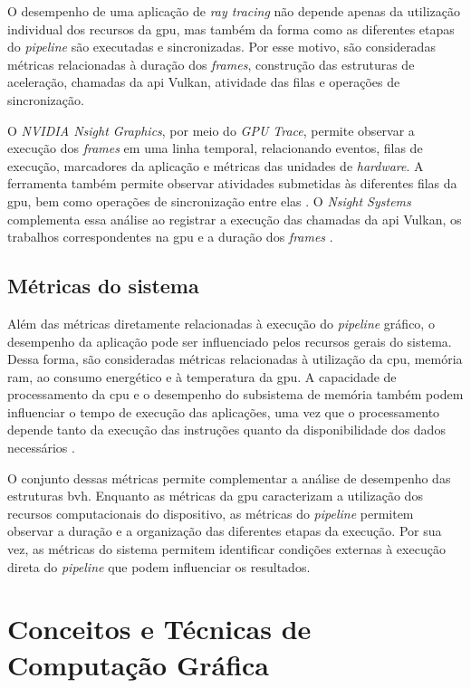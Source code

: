 O desempenho de uma aplicação de \textit{ray tracing} não depende apenas da utilização individual dos recursos da \gls{gpu}, mas também da forma como as diferentes etapas do \textit{pipeline} são executadas e sincronizadas. Por esse motivo, são consideradas métricas relacionadas à duração dos \textit{frames}, construção das estruturas de aceleração, chamadas da \gls{api} Vulkan, atividade das filas e operações de sincronização.

O \textit{NVIDIA Nsight Graphics}, por meio do \textit{GPU Trace}, permite observar a execução dos \textit{frames} em uma linha temporal, relacionando eventos, filas de execução, marcadores da aplicação e métricas das unidades de \textit{hardware}. A ferramenta também permite observar atividades submetidas às diferentes filas da \gls{gpu}, bem como operações de sincronização entre elas \cite{nvidia_nsight_graphics_gpu_trace_ui}. O \textit{Nsight Systems} complementa essa análise ao registrar a execução das chamadas da \gls{api} Vulkan, os trabalhos correspondentes na \gls{gpu} e a duração dos \textit{frames} \cite{nvidia_nsight_systems}.

\subsection{Métricas do sistema}

Além das métricas diretamente relacionadas à execução do \textit{pipeline} gráfico, o desempenho da aplicação pode ser influenciado pelos recursos gerais do sistema. Dessa forma, são consideradas métricas relacionadas à utilização da \gls{cpu}, memória \gls{ram}, ao consumo energético e à temperatura da \gls{gpu}. A capacidade de processamento da \gls{cpu} e o desempenho do subsistema de memória também podem influenciar o tempo de execução das aplicações, uma vez que o processamento depende tanto da execução das instruções quanto da disponibilidade dos dados necessários \cite{franchitti2024introduction}.

O conjunto dessas métricas permite complementar a análise de desempenho das estruturas \gls{bvh}. Enquanto as métricas da \gls{gpu} caracterizam a utilização dos recursos computacionais do dispositivo, as métricas do \textit{pipeline} permitem observar a duração e a organização das diferentes etapas da execução. Por sua vez, as métricas do sistema permitem identificar condições externas à execução direta do \textit{pipeline} que podem influenciar os resultados.




\section{Conceitos e Técnicas de Computação Gráfica}

